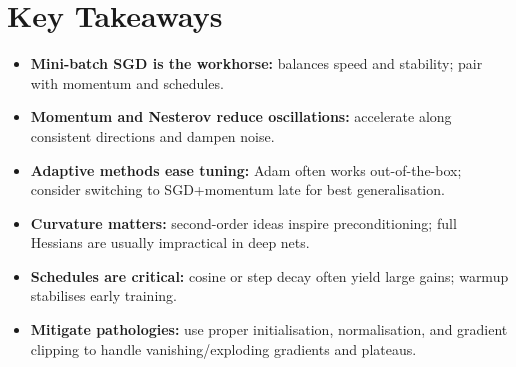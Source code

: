 
\section{Key Takeaways}
\label{sec:ch8-key-takeaways}

\begin{keytakeaways}
\begin{itemize}
    \item \textbf{Mini-batch SGD is the workhorse:} balances speed and stability; pair with momentum and schedules.
    \item \textbf{Momentum and Nesterov reduce oscillations:} accelerate along consistent directions and dampen noise.
    \item \textbf{Adaptive methods ease tuning:} Adam often works out-of-the-box; consider switching to SGD+momentum late for best generalisation.
    \item \textbf{Curvature matters:} second-order ideas inspire preconditioning; full Hessians are usually impractical in deep nets.
    \item \textbf{Schedules are critical:} cosine or step decay often yield large gains; warmup stabilises early training.
    \item \textbf{Mitigate pathologies:} use proper initialisation, normalisation, and gradient clipping to handle vanishing/exploding gradients and plateaus.
\end{itemize}
\end{keytakeaways}



